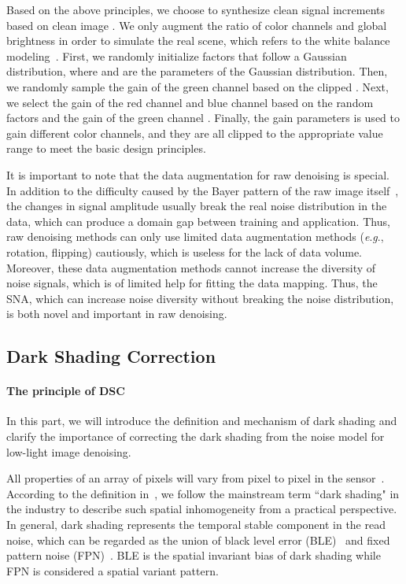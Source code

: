 \documentclass[sigconf,screen,nonacm]{acmart}
\newcommand{\eg}{\textit{e}.\textit{g}.}
\begin{document}
Based on the above principles, we choose to synthesize clean signal increments  based on clean image . We only augment the ratio of color channels and global brightness in order to simulate the real scene, which refers to the white balance modeling~\cite{CVPR19/Unprocess}.
    First, we randomly initialize factors  that follow a Gaussian distribution, where  and  are the parameters of the Gaussian distribution.
    Then, we randomly sample the gain of the green channel  based on the clipped .
    Next, we select the gain of the red channel  and blue channel  based on the random factors  and the gain of the green channel .
    Finally, the gain parameters  is used to gain different color channels, and they are all clipped to the appropriate value range to meet the basic design principles.



It is important to note that the data augmentation for raw denoising is special.
In addition to the difficulty caused by the Bayer pattern of the raw image itself~\cite{CVPRW19/fhq}, the changes in signal amplitude usually break the real noise distribution in the data, which can produce a domain gap between training and application.
Thus, raw denoising methods can only use limited data augmentation methods (\eg, rotation, flipping) cautiously, which is useless for the lack of data volume. Moreover, these data augmentation methods cannot increase the diversity of noise signals, which is of limited help for fitting the data mapping.
Thus, the SNA, which can increase noise diversity without breaking the noise distribution, is both novel and important in raw denoising.
    
  \subsection{Dark Shading Correction}
  \label{DSC}
    \paragraph{\textbf{The principle of DSC}}
In this part, we will introduce the definition and mechanism of dark shading and clarify the importance of correcting the dark shading from the noise model for low-light image denoising.

    All properties of an array of pixels will vary from pixel to pixel in the sensor~\cite{EMVA1288}.
    According to the definition in~\cite{darkshading}, we follow the mainstream term ``dark shading" in the industry to describe such spatial inhomogeneity from a practical perspective.
    In general, dark shading represents the temporal stable component in the read noise, which can be regarded as the union of black level error (BLE)~\cite{ICME21/RethinkNM, TPAMI21/ELD, nakamura2017image} and fixed pattern noise (FPN)~\cite{EMVA1288,TIP01/FPNR,TIP14/FPNR,arxiv2014/CMOS,2011/CMOS}.
BLE is the spatial invariant bias of dark shading while FPN is considered a spatial variant pattern.
\end{document}
